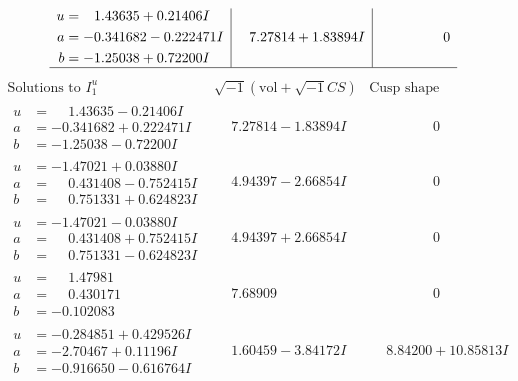 \documentclass[1p]{elsarticle_modified}
\theoremstyle{definition}
\newcommand{\I}{\sqrt{-1}}
\begin{document}
$$\begin{array}{c|c|c}
\begin{aligned}
u &= \phantom{-}1.43635 + 0.21406 I \\
a &= -0.341682 - 0.222471 I \\
b &= -1.25038 + 0.72200 I\end{aligned}
 & \phantom{-}7.27814 + 1.83894 I & \phantom{-0.000000 } 0\\
 \hline 
 \end{array}$$\newpage$$\begin{array}{c|c|c}  
\text{Solutions to }I^u_{1}& \I (\text{vol} + \sqrt{-1}CS) & \text{Cusp shape}\\
 \hline 
\begin{aligned}
u &= \phantom{-}1.43635 - 0.21406 I \\
a &= -0.341682 + 0.222471 I \\
b &= -1.25038 - 0.72200 I\end{aligned}
 & \phantom{-}7.27814 - 1.83894 I & \phantom{-0.000000 } 0 \\ \hline\begin{aligned}
u &= -1.47021 + 0.03880 I \\
a &= \phantom{-}0.431408 - 0.752415 I \\
b &= \phantom{-}0.751331 + 0.624823 I\end{aligned}
 & \phantom{-}4.94397 - 2.66854 I & \phantom{-0.000000 } 0 \\ \hline\begin{aligned}
u &= -1.47021 - 0.03880 I \\
a &= \phantom{-}0.431408 + 0.752415 I \\
b &= \phantom{-}0.751331 - 0.624823 I\end{aligned}
 & \phantom{-}4.94397 + 2.66854 I & \phantom{-0.000000 } 0 \\ \hline\begin{aligned}
u &= \phantom{-}1.47981\phantom{ +0.000000I} \\
a &= \phantom{-}0.430171\phantom{ +0.000000I} \\
b &= -0.102083\phantom{ +0.000000I}\end{aligned}
 & \phantom{-}7.68909\phantom{ +0.000000I} & \phantom{-0.000000 } 0 \\ \hline\begin{aligned}
u &= -0.284851 + 0.429526 I \\
a &= -2.70467 + 0.11196 I \\
b &= -0.916650 - 0.616764 I\end{aligned}
 & \phantom{-}1.60459 - 3.84172 I & \phantom{-}8.84200 + 10.85813 I \\ \hline\begin{aligned}

\end{aligned}
\end{array}$$
\end{document}
